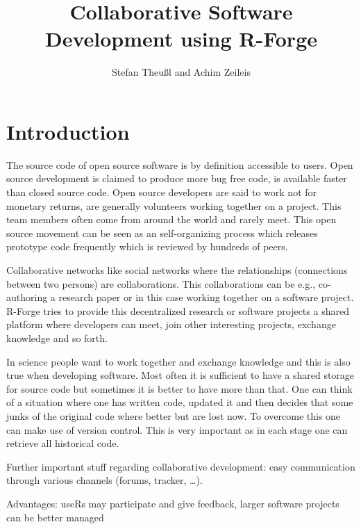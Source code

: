 \title{Collaborative Software Development using R-Forge}
\author{Stefan Theu\ss{}l and Achim Zeileis}

\maketitle

\section*{Introduction}


The source code of open source software is by definition accessible to
users. Open source development is claimed to produce more bug free
code, is available faster than closed source code. Open source
developers are said to work not for monetary returns, are generally
volunteers working together on a project. This team members often come
from around the world and rarely meet. This open source movement can
be seen as an self-organizing process which releases prototype code
frequently which is reviewed by hundreds of peers.  


Collaborative networks like social networks where the relationships
(connections between two persons) are collaborations. This
collaborations can be e.g., co-authoring a research paper or in this
case working together on a software project.
R-Forge tries to provide this decentralized research or software
projects a shared platform where developers can meet, join other
interesting projects, exchange knowledge and so forth. 

In science people want to work together and exchange knowledge and
this is also true when developing software. Most often it is
sufficient to have a shared storage for source code but sometimes it
is better to have more than that. One can think of a situation where one has
written code, updated it and then decides that some junks of the
original code where better but are lost now. To overcome this one can
make use of version control. This is very important as in each stage
one can retrieve all historical code.

Further important stuff regarding collaborative development: easy
communication through various channels (forums, tracker, \ldots).

Advantages: useRs may participate and give feedback, larger software
projects can be better managed 

